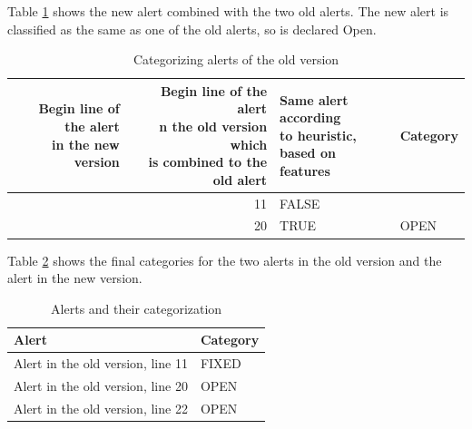 \documentclass[
]{article}
\begin{document}
\normalsize


%
%

Table \ref{tab_categorizing_new} shows the new alert combined with the
two old alerts. The new alert is classified as the same as one of the
old alerts, so is declared Open.

\small

\begin{table}[H]

\caption{\label{tab:unnamed-chunk-16}Categorizing alerts of the old version \label{tab_categorizing_new} }
\centering
\begin{tabular}[t]{r|r|l|l}
\hline
\makecell[l]{Begin line of the alert\\in the new version} & \makecell[l]{Begin line of the alert\\n the old version which\\is combined to the old alert} & \makecell[l]{Same alert according\\to heuristic,\\ based on features} & Category\\
\hline
\rowcolor{gray!6}   & 11 & FALSE & \\

\multirow[t]{-2}{*}{\raggedleft\arraybackslash 22} & 20 & TRUE & \multirow[t]{-2}{*}{\raggedright\arraybackslash OPEN}\\
\hline
\end{tabular}
\end{table}

\normalsize

%
%

Table \ref{tab_summary_categories} shows the final categories for the
two alerts in the old version and the alert in the new version.

\small

\begin{table}[H]

\caption{\label{tab:unnamed-chunk-17}Alerts and their categorization\label{tab_summary_categories} }
\centering
\begin{tabular}[t]{l|l}
\hline
Alert & Category\\
\hline
\rowcolor{gray!6}  Alert in the old version, line 11 & FIXED\\
\hline
Alert in the old version, line 20 & OPEN\\
\hline
\rowcolor{gray!6}  Alert in the old version, line 22 & OPEN\\
\hline
\end{tabular}
\end{table}
\end{document}

